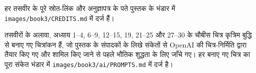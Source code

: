 हर तसवीर के पूरे स्रोत-लिंक और अनुज्ञापत्र के पते पुस्तक के भंडार में
\texttt{images/book3/CREDITS.md} में दर्ज हैं।

\bigskip
तसवीरों के अलावा, अध्याय 1--4, 6--9, 12--15, 19, 21--25 और 27--30 के
चौबीस चित्र कृत्रिम बुद्धि से बनाए गए चित्रांकन हैं, जो पुस्तक के
संपादकों के लिखे संकेतों से OpenAI की चित्र-निर्मिति द्वारा तैयार किए
गए और शामिल किए जाने से पहले भौतिक शुद्धता के लिए जाँचे गए। हर बनाए गए
चित्र का पूरा संकेत भंडार में
\texttt{images/book3/ai/PROMPTS.md} में दर्ज है।
\clearpage
